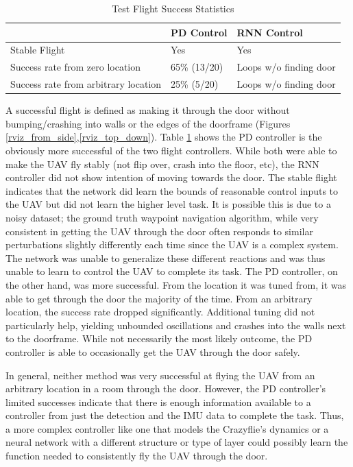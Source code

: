 \documentclass[12pt]{article}
\begin{document}
\begin{table}[]
\begin{tabular}{l|l|l|}
\cline{2-3}
                                                           & PD Control   & RNN Control            \\ \hline
\multicolumn{1}{|l|}{Stable Flight}                        & Yes          & Yes                    \\ \hline
\multicolumn{1}{|l|}{Success rate from zero location}      & 65\% (13/20) & Loops w/o finding door \\ \hline
\multicolumn{1}{|l|}{Success rate from arbitrary location} & 25\% (5/20)  & Loops w/o finding door \\ \hline
\end{tabular}
\vspace{20pt}
\caption{Test Flight Success Statistics}
\label{flight}
\end{table}

A successful flight is defined as making it through the door without bumping/crashing into walls or the edges of the doorframe (Figures \ref{rviz_from_side},\ref{rviz_top_down}). Table \ref{flight} shows the PD controller is the obviously more successful of the two flight controllers. While both were able to make the UAV fly stably (not flip over, crash into the floor, etc), the RNN controller did not show intention of moving towards the door. The stable flight indicates that the network did learn the bounds of reasonable control inputs to the UAV but did not learn the higher level task. It is possible this is due to a noisy dataset; the ground truth waypoint navigation algorithm, while very consistent in getting the UAV through the door often responds to similar perturbations slightly differently each time since the UAV is a complex system. The network was unable to generalize these different reactions and was thus unable to learn to control the UAV to complete its task. The PD controller, on the other hand, was more successful. From the location it was tuned from, it was able to get through the door the majority of the time. From an arbitrary location, the success rate dropped significantly. Additional tuning did not particularly help, yielding unbounded oscillations and crashes into the walls next to the doorframe. While not necessarily the most likely outcome, the PD controller is able to occasionally get the UAV through the door safely. 

In general, neither method was very successful at flying the UAV from an arbitrary location in a room through the door. However, the PD controller's limited successes indicate that there is enough information available to a controller from just the detection and the IMU data to complete the task. Thus, a more complex controller like one that models the Crazyflie's dynamics or a neural network with a different structure or type of layer could possibly learn the function needed to consistently fly the UAV through the door.
\end{document}
